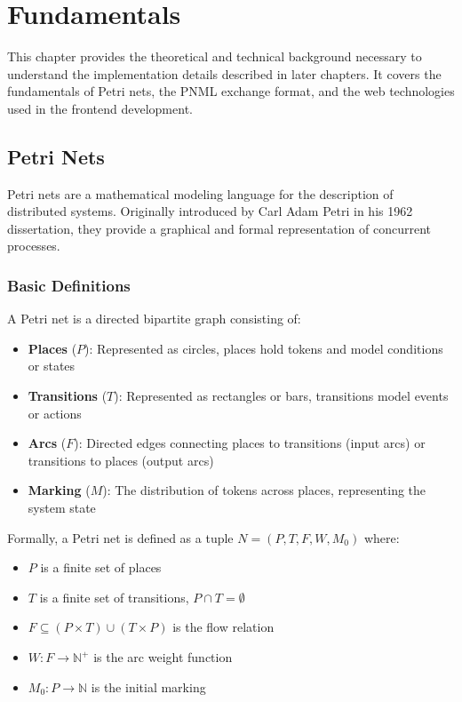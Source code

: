 \chapter{Fundamentals}
\label{chap:fundamentals}

This chapter provides the theoretical and technical background necessary to understand the implementation details described in later chapters. It covers the fundamentals of Petri nets, the PNML exchange format, and the web technologies used in the frontend development.

\section{Petri Nets}
\label{sec:petri-nets}

Petri nets are a mathematical modeling language for the description of distributed systems. Originally introduced by Carl Adam Petri in his 1962 dissertation, they provide a graphical and formal representation of concurrent processes.

\subsection{Basic Definitions}

A Petri net is a directed bipartite graph consisting of:

\begin{itemize}
    \item \textbf{Places} ($P$): Represented as circles, places hold tokens and model conditions or states
    \item \textbf{Transitions} ($T$): Represented as rectangles or bars, transitions model events or actions
    \item \textbf{Arcs} ($F$): Directed edges connecting places to transitions (input arcs) or transitions to places (output arcs)
    \item \textbf{Marking} ($M$): The distribution of tokens across places, representing the system state
\end{itemize}

Formally, a Petri net is defined as a tuple $N = (P, T, F, W, M_0)$ where:
\begin{itemize}
    \item $P$ is a finite set of places
    \item $T$ is a finite set of transitions, $P \cap T = \emptyset$
    \item $F \subseteq (P \times T) \cup (T \times P)$ is the flow relation
    \item $W: F \rightarrow \mathbb{N}^+$ is the arc weight function
    \item $M_0: P \rightarrow \mathbb{N}$ is the initial marking
\end{itemize}

